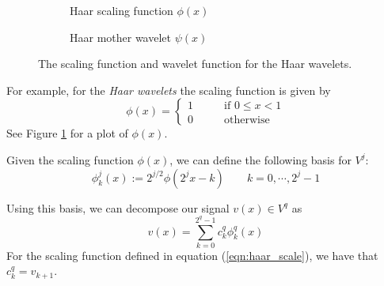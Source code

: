 \begin{figure}
  \centering
  \begin{subfigure}{0.4\textwidth}
    \centering
    \caption{Haar scaling function $\phi(x)$}
    \label{fig:haar_scaling}
  \end{subfigure}
  \begin{subfigure}{0.4\textwidth}
    \centering
    \caption{Haar mother wavelet $\psi(x)$}
    \label{fig:haar_mother}
  \end{subfigure}
  \caption{The scaling function and wavelet function for the Haar wavelets.}
  \label{fig:haar_1d}
\end{figure}

For example, for the \emph{Haar wavelets} the scaling function is given by
\begin{equation}
  \label{eqn:haar_scale}
  \phi(x) = \left\{ \begin{array}{rl}
    1& \qquad \mbox{if $0\leq x < 1$}\\
    0& \qquad \mbox{otherwise}
  \end{array}\right.
\end{equation}
See Figure \ref{fig:haar_scaling} for a plot of $\phi(x)$.

Given the scaling function $\phi(x)$, we can define the following basis for $V^j$:
\begin{equation}
  \label{eqn:haar_scaling_basis}
  \phi_k^j(x) := 2^{j/2}\phi(2^j x-k) \qquad k = 0,\cdots, 2^j-1
\end{equation}

Using this basis, we can decompose our signal $v(x)\in V^q$ as 
\begin{equation*}
  v(x) = \sum_{k=0}^{2^q-1} c_k^q \phi_k^q(x)
\end{equation*}
For the scaling function defined in equation (\ref{eqn:haar_scale}), we have that $c_k^q = v_{k+1}$.

